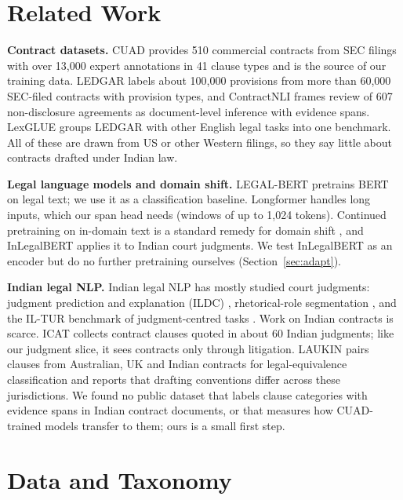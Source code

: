 \documentclass[conference]{IEEEtran}
\begin{document}
\section{Related Work}
\textbf{Contract datasets.} CUAD \cite{hendrycks2021cuad} provides 510 commercial contracts from SEC filings with over 13,000 expert annotations in 41 clause types and is the source of our training data. LEDGAR \cite{tuggener2020ledgar} labels about 100,000 provisions from more than 60,000 SEC-filed contracts with provision types, and ContractNLI \cite{koreeda2021contractnli} frames review of 607 non-disclosure agreements as document-level inference with evidence spans. LexGLUE \cite{chalkidis2022lexglue} groups LEDGAR with other English legal tasks into one benchmark. All of these are drawn from US or other Western filings, so they say little about contracts drafted under Indian law.

\textbf{Legal language models and domain shift.} LEGAL-BERT \cite{chalkidis2020legalbert} pretrains BERT on legal text; we use it as a classification baseline. Longformer \cite{beltagy2020longformer} handles long inputs, which our span head needs (windows of up to 1,024 tokens). Continued pretraining on in-domain text is a standard remedy for domain shift \cite{gururangan2020dontstop}, and InLegalBERT \cite{paul2023inlegalbert} applies it to Indian court judgments. We test InLegalBERT as an encoder but do no further pretraining ourselves (Section~\ref{sec:adapt}).

\textbf{Indian legal NLP.} Indian legal NLP has mostly studied court judgments: judgment prediction and explanation (ILDC) \cite{malik2021ildc}, rhetorical-role segmentation \cite{kalamkar2022rhetorical}, and the IL-TUR benchmark of judgment-centred tasks \cite{joshi2024iltur}. Work on Indian contracts is scarce. ICAT \cite{icat} collects contract clauses quoted in about 60 Indian judgments; like our judgment slice, it sees contracts only through litigation. LAUKIN \cite{singh2026laukin} pairs clauses from Australian, UK and Indian contracts for legal-equivalence classification and reports that drafting conventions differ across these jurisdictions. We found no public dataset that labels clause categories with evidence spans in Indian contract documents, or that measures how CUAD-trained models transfer to them; ours is a small first step.

\section{Data and Taxonomy}\label{sec:data}
\end{document}
